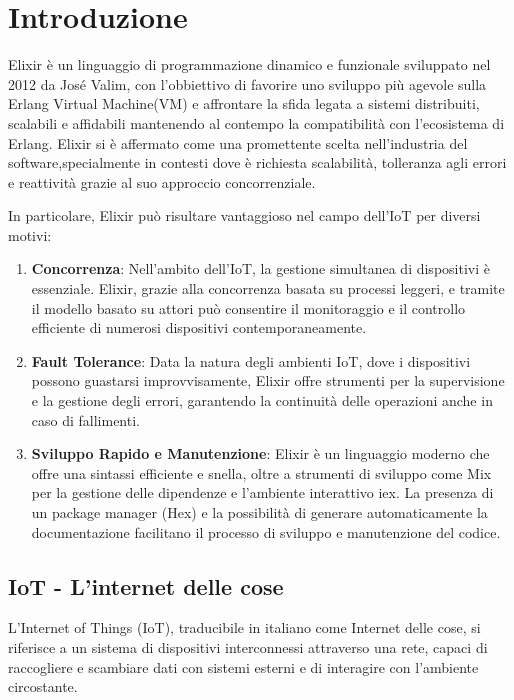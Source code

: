 \chapter{Introduzione}

Elixir è un linguaggio di programmazione dinamico e funzionale
sviluppato nel 2012 da José Valim,
con l'obbiettivo di favorire uno sviluppo più agevole
sulla Erlang Virtual Machine(VM) e affrontare la sfida legata
a sistemi distribuiti, scalabili e affidabili mantenendo al
contempo la compatibilità con l'ecosistema di Erlang.
Elixir si è affermato come una promettente scelta
nell'industria del software,specialmente in contesti dove è
richiesta scalabilità, tolleranza agli errori e reattività 
grazie al suo approccio concorrenziale.

In particolare, Elixir può risultare vantaggioso nel
campo dell'IoT per diversi motivi:
\begin{enumerate}
	\item \textbf{Concorrenza}: Nell'ambito dell'IoT, la gestione
	simultanea di dispositivi è essenziale.
	Elixir, grazie alla concorrenza basata su processi leggeri,
	e tramite il modello basato su attori può consentire il monitoraggio
	e il controllo efficiente di numerosi dispositivi contemporaneamente.
	\item \textbf{Fault Tolerance}: 
	Data la natura degli ambienti IoT, dove i dispositivi possono
	guastarsi improvvisamente, Elixir offre strumenti per la supervisione
	e la gestione degli errori, garantendo la continuità delle operazioni
	anche in caso di fallimenti.
	\item \textbf{Sviluppo Rapido e Manutenzione}:
	Elixir è un linguaggio moderno che offre una sintassi efficiente e snella,
	oltre a strumenti di sviluppo come Mix per la gestione delle dipendenze
	e l'ambiente interattivo iex. La presenza di un package manager (Hex)\cite{Hex15:online}
	e la possibilità di generare automaticamente la documentazione
	facilitano il processo di sviluppo e manutenzione del codice.
	
\end{enumerate}

\section{IoT - L'internet delle cose}

L'Internet of Things (IoT),
traducibile in italiano come Internet delle cose,
si riferisce a un sistema di dispositivi interconnessi
attraverso una rete, capaci di raccogliere e scambiare
dati con sistemi esterni e di interagire con l'ambiente circostante.

